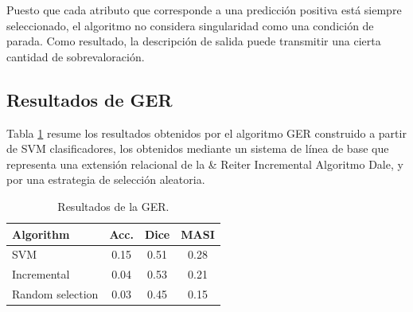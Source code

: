 Puesto que cada atributo que corresponde a una predicci\'on positiva est\'a siempre seleccionado, el algoritmo no considera singularidad como una condici\'on de parada. Como resultado, la descripci\'on de salida puede transmitir una cierta cantidad de sobrevaloraci\'on.


\subsection{Resultados de GER }

Tabla \ref{tab-reg-results} resume los resultados obtenidos por el algoritmo GER construido a partir de SVM clasificadores, los obtenidos mediante un sistema de l\'{i}nea de base que representa una extensi\'on relacional de la \& Reiter Incremental Algoritmo Dale, y por una estrategia de selecci\'on aleatoria.

\begin{table}[H]
\begin{center}
\begin{tabular} {  l c c c }
\hline
{Algorithm}							& {Acc.} 	& { Dice}		& MASI \\ \hline 
SVM											& 0.15		& 0.51			& 0.28 \\
Incremental							& 0.04		& 0.53			& 0.21 \\
Random selection       	& 0.03    & 0.45      & 0.15 \\
\hline
\end{tabular}
\end{center}
\caption{Resultados de la GER.}
\label{tab-reg-results}

\end{table}



